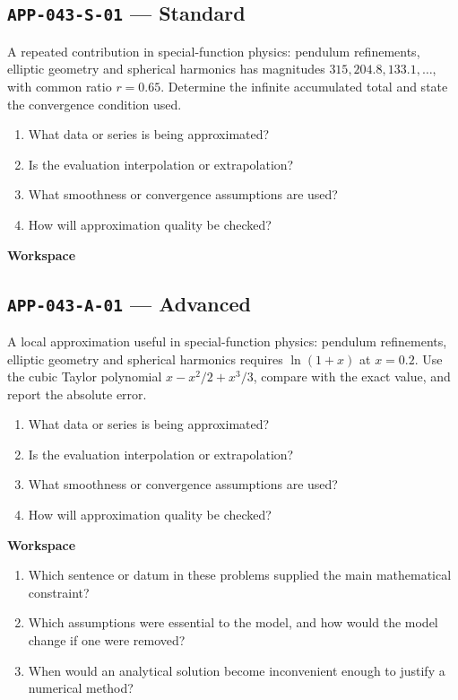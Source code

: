 \documentclass[11pt]{book}
\newcommand{\pid}[1]{\texttt{#1}}
\newcommand{\workspace}{\par\vspace{0.7in}\hrulefill\par\vspace{0.55in}\hrulefill\par}
\begin{document}
\subsection*{\pid{APP-043-S-01} — Standard}
\begin{problembox}
A repeated contribution in special-function physics: pendulum refinements, elliptic geometry and spherical harmonics has magnitudes $315, 204.8, 133.1,\ldots$, with common ratio $r=0.65$. Determine the infinite accumulated total and state the convergence condition used.
\end{problembox}
\begin{promptbox}\begin{enumerate}
\item What data or series is being approximated?
\item Is the evaluation interpolation or extrapolation?
\item What smoothness or convergence assumptions are used?
\item How will approximation quality be checked?
\end{enumerate}\end{promptbox}
\textbf{Workspace}\workspace
{}
\subsection*{\pid{APP-043-A-01} — Advanced}
\begin{problembox}
A local approximation useful in special-function physics: pendulum refinements, elliptic geometry and spherical harmonics requires $\ln(1+x)$ at $x=0.2$. Use the cubic Taylor polynomial $x-x^2/2+x^3/3$, compare with the exact value, and report the absolute error.
\end{problembox}
\begin{promptbox}\begin{enumerate}
\item What data or series is being approximated?
\item Is the evaluation interpolation or extrapolation?
\item What smoothness or convergence assumptions are used?
\item How will approximation quality be checked?
\end{enumerate}\end{promptbox}
\textbf{Workspace}\workspace
\begin{reflectionbox}\begin{enumerate}
\item Which sentence or datum in these problems supplied the main mathematical constraint?
\item Which assumptions were essential to the model, and how would the model change if one were removed?
\item When would an analytical solution become inconvenient enough to justify a numerical method?
\end{enumerate}\end{reflectionbox}
\end{document}
